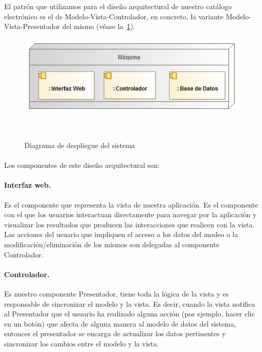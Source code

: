 El patrón que utilizamos para el diseño arquitectural de nuestro catálogo electrónico es el de Modelo-Vista-Controlador, en concreto, la variante Modelo-Vista-Presentador del mismo (véase la~\cref{fig:diagDespliegue}).

\vspace{.2cm}
\begin{figure}[ht]
	\centerline{\includegraphics[scale=0.75]{img/diagrama_despliegue}}\
	\caption{Diagrama de despliegue del sistema}
	\label{fig:diagDespliegue}
\end{figure}
\paragraph{}
\paragraph{}
\noindent Los componentes de este diseño arquitectural son:

\paragraph{Interfaz web.} Es el componente que representa la vista de nuestra aplicación. Es el componente con el que los usuarios interactuan directamente para navegar por la aplicación y visualizar los resultados que producen las interacciones que realicen con la vista. Las acciones del usuario que impliquen el acceso a los datos del modeo o la modificación/eliminación de los mismos son delegadas al componente Controlador.

\paragraph{Controlador.} Es nuestro componente Presentador, tiene toda la lógica de la vista 
y es responsable de sincronizar el modelo y la vista. Es decir, cuando la vista notifica al 
Presentador que el usuario ha realizado alguna acción (por ejemplo, hacer clic en un botón) que afecta de alguna manera al modelo de datos del sistema, entonces el presentador se encarga de actualizar los datos pertinentes y sincronizar los cambios entre el modelo y la vista.

